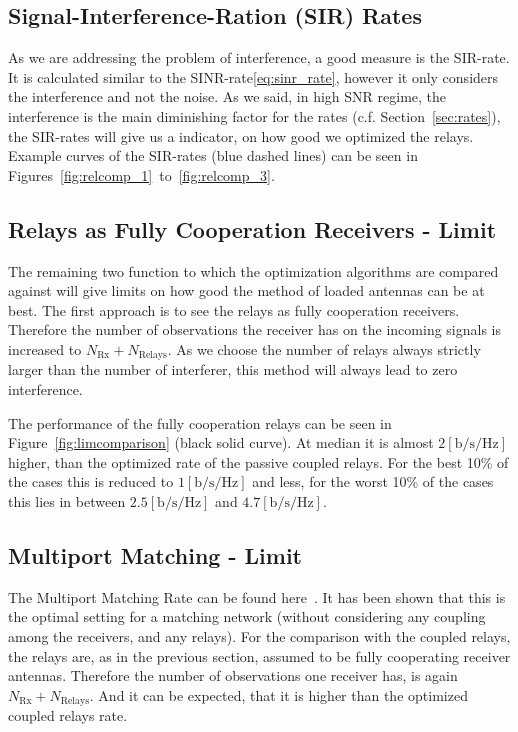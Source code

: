 \subsection{Signal-Interference-Ration (SIR) Rates}
\label{sec:sir}
As we are addressing the problem of interference, a good measure is the SIR-rate.
It is calculated similar to the SINR-rate\eqref{eq:sinr_rate}, however it only considers the interference and not the noise.
As we said, in high SNR regime, the interference is the main diminishing factor for the rates (c.f. Section~\ref{sec:rates}), the SIR-rates will give us a indicator, on how good we optimized the relays.
Example curves of the SIR-rates (blue dashed lines) can be seen in Figures~\ref{fig:relcomp_1}~to~\ref{fig:relcomp_3}.

\subsection{Relays as Fully Cooperation Receivers - Limit}
\label{sec:fullrx_limit}
The remaining two function to which the optimization algorithms are compared against will give limits on how good the method of loaded antennas can be at best.
The first approach is to see the relays as fully cooperation receivers.
Therefore the number of observations the receiver has on the incoming signals is increased to $N_\text{Rx} + N_\text{Relays}$.
As we choose the number of relays always strictly larger than the number of interferer, this method will always lead to zero interference.

The performance of the fully cooperation relays can be seen in Figure~\ref{fig:limcomparison} (black solid curve).
At median it is almost $2 \left[\text{b/s/Hz}\right]$ higher, than the optimized rate of the passive coupled relays.
For the best 10\% of the cases this is reduced to $1 \left[\text{b/s/Hz}\right]$ and less,
for the worst 10\% of the cases this lies in between  $2.5 \left[\text{b/s/Hz}\right]$ and $4.7 \left[\text{b/s/Hz}\right]$.


\subsection{Multiport Matching - Limit}
\label{sec:mp_limit}

The Multiport Matching Rate can be found here~\cite{Nossek}.
It has been shown that this is the optimal setting for a matching network (without considering any coupling among the receivers, and any relays).
For the comparison with the coupled relays, the relays are, as in the previous section, assumed to be fully cooperating receiver antennas.
Therefore the number of observations one receiver has, is again $N_\text{Rx} + N_\text{Relays}$.
And it can be expected, that it is higher than the optimized coupled relays rate.

